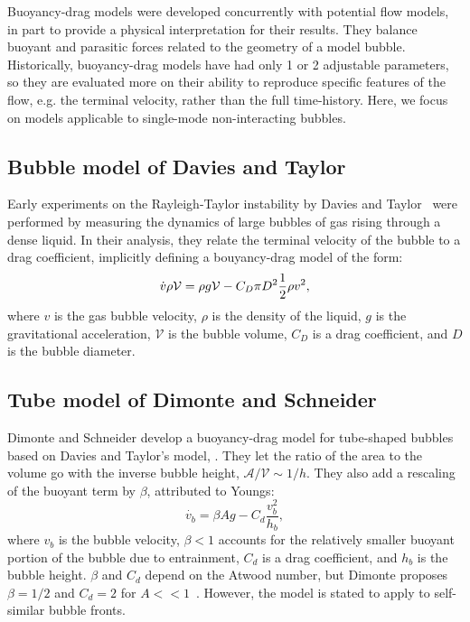 Buoyancy-drag models were developed concurrently with potential flow models, in part to provide a physical interpretation for their results.
They balance buoyant and parasitic forces related to the geometry of a model bubble.
Historically, buoyancy-drag models have had only 1 or 2 adjustable parameters, so they are evaluated more on their ability to reproduce specific features of the flow, e.g. the terminal velocity, rather than the full time-history.
Here, we focus on models applicable to single-mode non-interacting bubbles.

\subsection{Bubble model of Davies and Taylor}

Early experiments on the Rayleigh-Taylor instability by Davies and Taylor~\cite{Davies1950a} were performed by measuring the dynamics of large bubbles of gas rising through a dense liquid.
In their analysis, they relate the terminal velocity of the bubble to a drag coefficient, implicitly defining a bouyancy-drag model of the form:
\begin{equation} \elabel{dtbd}
\dot{v} \rho \mathcal{V} = \rho g \mathcal{V} - C_D \pi D^2 \frac{1}{2} \rho v^2,
\end{equation}
where $v$ is the gas bubble velocity,
$\rho$ is the density of the liquid,
$g$ is the gravitational acceleration,
$\mathcal{V}$ is the bubble volume,
$C_D$ is a drag coefficient, and
$D$ is the bubble diameter.


\subsection{Tube model of Dimonte and Schneider}

Dimonte and Schneider develop a buoyancy-drag model for tube-shaped bubbles~\cite{Dimonte1996,Dimonte2000a} based on Davies and Taylor's model, .
They let the ratio of the area to the volume go with the inverse bubble height, $\mathcal{A} / \mathcal{V} \sim 1/h$.
They also add a rescaling of the buoyant term by $\beta$, attributed to Youngs:
\begin{equation}
\dot{v_b}  = \beta A g - C_d \frac{v_b^2}{h_b}, 
\end{equation}
where $v_b$ is the bubble velocity,
$\beta < 1$ accounts for the relatively smaller buoyant portion of the bubble due to entrainment,
$C_d$ is a drag coefficient, and
$h_b$ is the bubble height.
$\beta$ and $C_d$ depend on the Atwood number, but Dimonte proposes $\beta = 1/2$ and $C_d = 2$ for $A << 1$~\cite{Dimonte2000}.
However, the model is stated to apply to self-similar bubble fronts.

